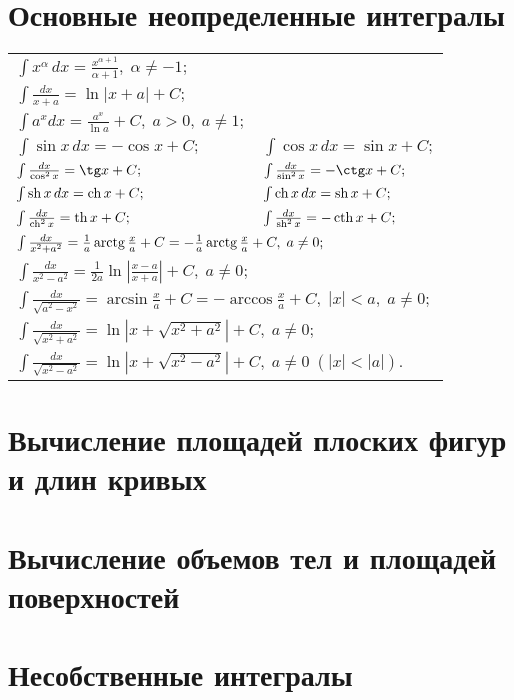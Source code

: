 \section{Основные неопределенные интегралы}
\noindent\begin{longtable}[l]{l l}
$\int x^\alpha \,dx = \frac{x^{\alpha+1}}{\alpha+1},\; \alpha\neq -1;$ & $ $ 
\\ $\int\frac{dx}{x+a} = \ln|x+a|+C;$ & $ $ 
\\ $\int a^x dx = \frac{a^x}{\ln a} + C, \; a>0,\; a\neq 1;$ & $ $ 
\\ $\int \sin x\,dx =-\cos x + C; $ 
& $\int \cos x \,dx = \sin x + C;$ 
\\ $\int \frac{dx}{\cos^2 x} = \tg x + C;$ 
& $\int \frac{dx}{\sin^2 x} = -\ctg x + C;$ 
\\ $\int \mathop{\rm sh}\nolimits x \,dx = \mathop{\rm ch}\nolimits x + C; $ 
& $\int \mathop{\rm ch}\nolimits x \,dx = \mathop{\rm sh}\nolimits x + C;$ 
\\ $\int \frac{dx}{\mathop{\rm ch}\nolimits^2 x} = \mathop{\rm th}\nolimits x + C; $ 
& $\int \frac{dx}{\mathop{\rm sh}\nolimits^2 x} = -\mathop{\rm cth}\nolimits x + C; $ 
\\ \multicolumn{2}{l}{$\int\frac{dx}{x^2+a^2} = \frac{1}{a}\mathop{\rm arctg}\nolimits\frac{x}{a} + C = -\frac{1}{a}\mathop{\rm arctg}\nolimits\frac{x}{a} + C,\; a\neq 0; $}
\\ \multicolumn{2}{l}{$\int\frac{dx}{x^2-a^2} = \frac{1}{2a}\ln\left|\frac{x-a}{x+a}\right| + C, \; a\neq 0 ;$ }
\\ \multicolumn{2}{l}{$\int\frac{dx}{\sqrt{a^2-x^2}} = \arcsin\frac{x}{a} + C=-\arccos\frac{x}{a} + C,\; |x|<a,\;a\neq 0;$}
\\ \multicolumn{2}{l}{$\int\frac{dx}{\sqrt{x^2+a^2}} = \ln|x+\sqrt{x^2+a^2}|+C,\; a\neq 0; $}
\\\multicolumn{2}{l}{$\int\frac{dx}{\sqrt{x^2-a^2}}= \ln|x+\sqrt{x^2-a^2}|+C,\; a\neq 0 \;(|x|<|a|). $}
\end{longtable}

\section{Вычисление площадей плоских фигур и длин кривых}



\section{Вычисление объемов тел и площадей поверхностей}

\section{Несобственные интегралы}

